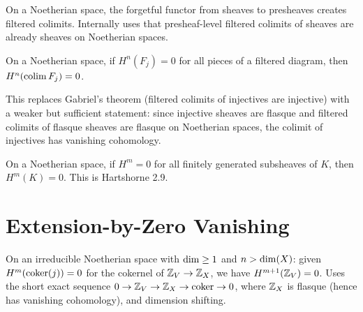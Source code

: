 \begin{theorem}\label{thm:createsFilteredColimit}
  \leanok
  On a Noetherian space, the forgetful functor from sheaves to presheaves
  creates filtered colimits. Internally uses that presheaf-level filtered
  colimits of sheaves are already sheaves on Noetherian spaces.
\end{theorem}

\begin{theorem}\label{thm:sheafH_preserves_filtered_colimits}
  \leanok
  On a Noetherian space, if $H^n(F_j) = 0$ for all pieces of a filtered
  diagram, then $H^n(\operatorname{colim} F_j) = 0$.

  This replaces Gabriel's theorem (filtered colimits of injectives are injective)
  with a weaker but sufficient statement: since injective sheaves are flasque
  and filtered colimits of flasque sheaves are flasque on Noetherian spaces,
  the colimit of injectives has vanishing cohomology.
\end{theorem}

\begin{theorem}\label{thm:cohomology_vanishing_fg}
  \leanok
  On a Noetherian space, if $H^m = 0$ for all finitely generated subsheaves
  of $K$, then $H^m(K) = 0$. This is Hartshorne 2.9.
\end{theorem}


\chapter{Extension-by-Zero Vanishing}\label{ch:zeroOutsideVanishing}

\begin{theorem}\label{thm:zeroOutsideInt_vanishing}
  \leanok
  On an irreducible Noetherian space with $\operatorname{dim} \ge 1$ and $n > \operatorname{dim}(X)$:
  given $H^m(\operatorname{coker}(j)) = 0$ for the cokernel of $\mathbb{Z}_V \to \mathbb{Z}_X$,
  we have $H^{m+1}(\mathbb{Z}_V) = 0$. Uses the short exact sequence
  $0 \to \mathbb{Z}_V \to \mathbb{Z}_X \to \operatorname{coker} \to 0$, where $\mathbb{Z}_X$ is flasque (hence has
  vanishing cohomology), and dimension shifting.
\end{theorem}

